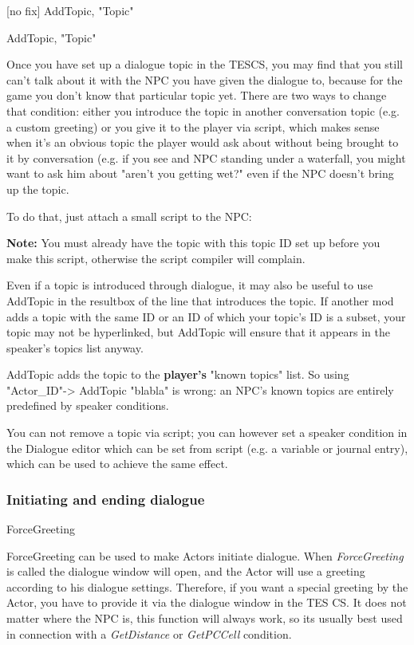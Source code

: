{[}no fix{]} AddTopic, "Topic"

AddTopic, "Topic"

Once you have set up a dialogue topic in the TESCS, you may find that
you still can't talk about it with the NPC you have given the dialogue
to, because for the game you don't know that particular topic yet. There
are two ways to change that condition: either you introduce the topic in
another conversation topic (e.g. a custom greeting) or you give it to
the player via script, which makes sense when it's an obvious topic the
player would ask about without being brought to it by conversation (e.g.
if you see and NPC standing under a waterfall, you might want to ask him
about "aren't you getting wet?" even if the NPC doesn't bring up the
topic.

To do that, just attach a small script to the NPC:



\textbf{Note:} You must already have the topic with this topic ID set up
before you make this script, otherwise the script compiler will
complain.

Even if a topic is introduced through dialogue, it may also be useful to
use AddTopic in the resultbox of the line that introduces the topic. If
another mod adds a topic with the same ID or an ID of which your topic's
ID is a subset, your topic may not be hyperlinked, but AddTopic will
ensure that it appears in the speaker's topics list anyway.

AddTopic adds the topic to the \textbf{player's} "known topics" list. So
using\\
"Actor\_ID"-> AddTopic "blabla" is wrong: an NPC's known
topics are entirely predefined by speaker conditions.

You can not remove a topic via script; you can however set a speaker
condition in the Dialogue editor which can be set from script (e.g. a
variable or journal entry), which can be used to achieve the same
effect.

\hypertarget{initiating-and-ending-dialogue}{%
\subsubsection{Initiating and ending
dialogue}\label{initiating-and-ending-dialogue}}

ForceGreeting

ForceGreeting can be used to make Actors initiate dialogue. When
\emph{ForceGreeting} is called the dialogue window will open, and the
Actor will use a greeting according to his dialogue settings. Therefore,
if you want a special greeting by the Actor, you have to provide it via
the dialogue window in the TES CS. It does not matter where the NPC is,
this function will always work, so its usually best used in connection
with a \emph{GetDistance} or \emph{GetPCCell} condition.

